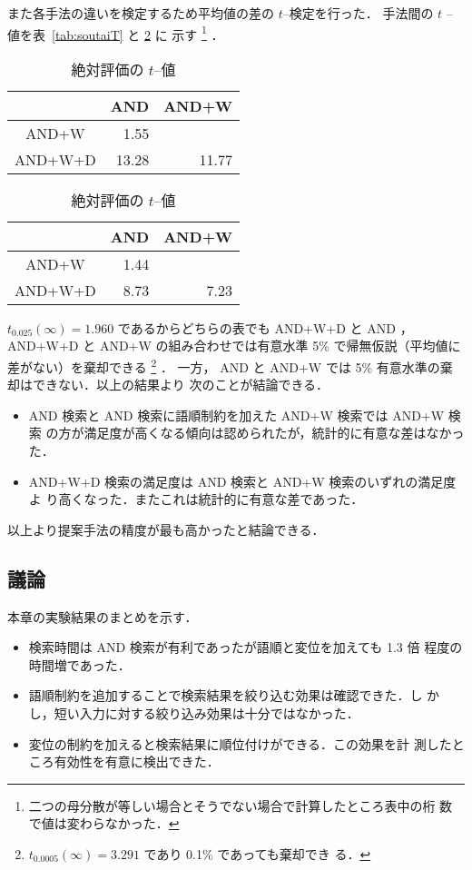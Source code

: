 また各手法の違いを検定するため平均値の差の $t$--検定を行った．
手法間の $t$ --値を表~\ref{tab:soutaiT} と \ref{tab:zettaiT} に
示す
\footnote{二つの母分散が等しい場合とそうでない場合で計算したところ表中の桁
数で値は変わらなかった．}
．
\begin{table}
\vspace*{-4mm}
 \begin{center}
  \caption{相対評価の $t$--値}
  \label{tab:soutaiT}
  \begin{tabular}{c|rr}\hline\hline
& AND & AND+W \\\hline
AND+W & 1.55 & \\
AND+W+D & 13.28 & 11.77 \\\hline
  \end{tabular}
 \end{center}
\bigskip
 \begin{center}
  \caption{絶対評価の $t$--値}
  \label{tab:zettaiT}
  \begin{tabular}{c|rr}\hline\hline
& AND & AND+W \\\hline
AND+W & 1.44 & \\
AND+W+D & 8.73 & 7.23 \\\hline
  \end{tabular}
 \end{center}
\end{table}
$t_{0.025}(\infty) = 1.960$ であるからどちらの表でも AND+W+D と AND 
，AND+W+D と AND+W の組み合わせでは有意水準 5\% で帰無仮説（平均値に差がない）を棄却できる
\footnote{$t_{0.0005}(\infty) = 3.291$ であり 0.1\% であっても棄却でき
る．}
．
一方， AND と AND+W では 5\% 有意水準の棄却はできない．以上の結果より
次のことが結論できる．
\begin{itemize}
 \item AND 検索と AND 検索に語順制約を加えた AND+W 検索では AND+W 検索
の方が満足度が高くなる傾向は認められたが，統計的に有意な差はなかった．
 \item AND+W+D 検索の満足度は AND 検索と AND+W 検索のいずれの満足度よ
り高くなった．またこれは統計的に有意な差であった．
\end{itemize}
以上より提案手法の精度が最も高かったと結論できる．
\vspace*{-1.5mm}
\subsection{議論}
\vspace*{-0.5mm}
本章の実験結果のまとめを示す．
\begin{itemize}
 \item 検索時間は AND 検索が有利であったが語順と変位を加えても  1.3 倍
程度の時間増であった．
 \item 語順制約を追加することで検索結果を絞り込む効果は確認できた．し
かし，短い入力に対する絞り込み効果は十分ではなかった．
 \item 変位の制約を加えると検索結果に順位付けができる．この効果を計
測したところ有効性を有意に検出できた．
\end{itemize}

